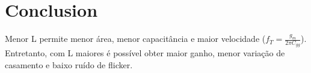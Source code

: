 \documentclass[10pt, conference,a4paper]{IEEEtran}
\begin{document}
\section{Conclusion}
Menor L permite menor área, menor capacitância e maior velocidade ($f_T = \frac{g_m}{2 \pi C_{gg}}$). Entretanto, com L maiores é possível obter maior ganho, menor variação de casamento e baixo ruído de flicker.




%

  

%
%

\end{document}
